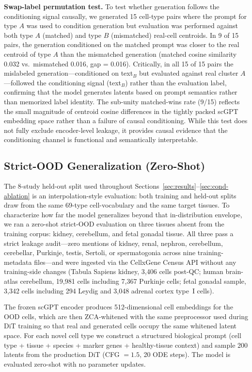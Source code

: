 \documentclass[11pt,a4paper]{article}
\begin{document}
\textbf{Swap-label permutation test.} To test whether generation follows the conditioning signal causally, we generated 15 cell-type pairs where the prompt for type $A$ was used to condition generation but evaluation was performed against both type $A$ (matched) and type $B$ (mismatched) real-cell centroids. In 9 of 15 pairs, the generation conditioned on the matched prompt was closer to the real centroid of type $A$ than the mismatched generation (matched cosine similarity 0.032 vs.\ mismatched 0.016, gap = 0.016). Critically, in all 15 of 15 pairs the mislabeled generation---conditioned on text$_B$ but evaluated against real cluster $A$---followed the conditioning signal (text$_B$) rather than the evaluation label, confirming that the model generates latents based on prompt semantics rather than memorized label identity. The sub-unity matched-wins rate (9/15) reflects the small magnitude of centroid cosine differences in the tightly packed scGPT embedding space rather than a failure of causal conditioning. While this test does not fully exclude encoder-level leakage, it provides causal evidence that the conditioning channel is functional and semantically interpretable.

\subsection{Strict-OOD Generalization (Zero-Shot)}\label{sec:strict-ood}

The 8-study held-out split used throughout Sections~\ref{sec:results}--\ref{sec:cond-ablation} is an interpolation-style evaluation: both training and held-out splits draw from the same 69-type cell-vocabulary and the same target tissues. To characterize how far the model generalizes beyond that in-distribution envelope, we ran a zero-shot strict-OOD evaluation on three tissues absent from the training corpus: kidney, cerebellum, and fetal gonadal tissue. All three pass a strict leakage audit---zero mentions of kidney, renal, nephron, cerebellum, cerebellar, Purkinje, testis, Sertoli, or spermatogonia across nine training-metadata files---and were ingested via the CellxGene Census API without any training-side changes (Tabula Sapiens kidney, 3{,}406 cells post-QC; human brain-atlas cerebellum, 19{,}981 cells including 7{,}367 Purkinje cells; fetal gonadal sample, 3{,}342 cells including 294 Leydig and 3{,}048 adrenal cortex type~I cells).

The frozen scGPT encoder produces 512-dimensional cell embeddings for the OOD cells, which are then ZCA-whitened with the same preprocessor used during DiT training so that real and generated cells occupy the same whitened latent space. For each novel cell type we construct a structured biological prompt (cell type + tissue + species + marker genes + healthy-tissue context) and sample 200 latents from the production DiT (CFG $= 1.5$, 20 ODE steps). The model is evaluated zero-shot with no parameter updates.
\end{document}
